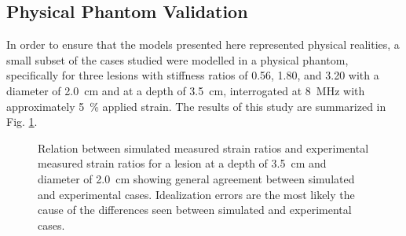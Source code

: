 		\subsection{Physical Phantom Validation}
			In order to ensure that the models presented here represented physical realities, a small subset of the cases studied were modelled in a physical phantom, specifically for three lesions with stiffness ratios of 0.56, 1.80, and 3.20 with a diameter of \SI{2.0}{\cm} and at a depth of \SI{3.5}{\cm}, interrogated at \SI{8}{\MHz} with approximately \SI{5}{\percent} applied strain. The results of this study are summarized in Fig. \ref{fig:phantom_validation}.

			\begin{figure}[!htb]
				\centering
				\caption[Experimental validation of quasi-static model results]{Relation between simulated measured strain ratios and experimental measured strain ratios for a lesion at a depth of \SI{3.5}{\cm} and diameter of \SI{2.0}{\cm} showing general agreement between simulated and experimental cases. Idealization errors are the most likely the cause of the differences seen between simulated and experimental cases.}
				\label{fig:phantom_validation}
			\end{figure}

